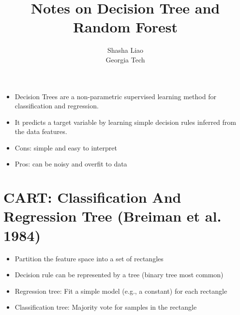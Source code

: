 \documentclass[twoside,12pt]{article}
\begin{document}
\title{Notes on Decision Tree and Random Forest}
\author {Shasha Liao \\ Georgia Tech}
\maketitle
\tableofcontents
\newpage
\begin{itemize}
\item Decision Trees are a non-parametric supervised learning method for classification and regression. 
\item It predicts a target variable by learning simple decision rules inferred from the data features. 
\item Cons: simple and easy to interpret 
\item Pros: can be noisy and overfit to data 
\end{itemize}
\section{CART: Classification And Regression Tree (Breiman et al. 1984)}
\begin{itemize}
\item Partition the feature space into a set of rectangles 
\item Decision rule can be represented by a tree (binary tree most common)
\item Regression tree: Fit a simple model (e.g., a constant) for each rectangle
\item Classification tree: Majority vote for samples in the rectangle
\end{itemize}
\end{document}
